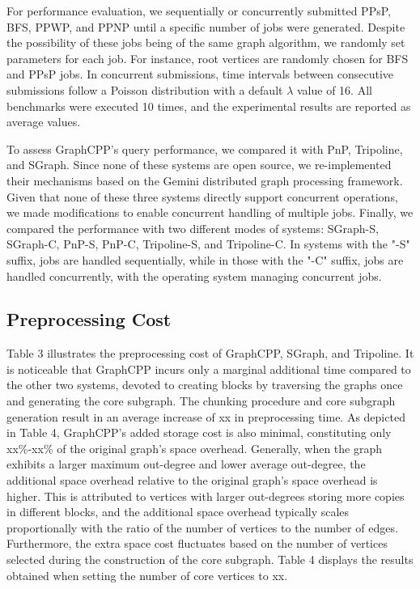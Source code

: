 \documentclass[lettersize,journal]{IEEEtran} %
\begin{document}
For performance evaluation, we sequentially or concurrently submitted PPsP, BFS, PPWP, and PPNP until a specific number of jobs were generated. Despite the possibility of these jobs being of the same graph algorithm, we randomly set parameters for each job. For instance, root vertices are randomly chosen for BFS and PPsP jobs. In concurrent submissions, time intervals between consecutive submissions follow a Poisson distribution with a default $\lambda$ value of 16. All benchmarks were executed 10 times, and the experimental results are reported as average values.

To assess GraphCPP's query performance, we compared it with PnP, Tripoline, and SGraph. Since none of these systems are open source, we re-implemented their mechanisms based on the Gemini distributed graph processing framework. Given that none of these three systems directly support concurrent operations, we made modifications to enable concurrent handling of multiple jobs. Finally, we compared the performance with two different modes of systems: SGraph-S, SGraph-C, PnP-S, PnP-C, Tripoline-S, and Tripoline-C. In systems with the "-S" suffix, jobs are handled sequentially, while in those with the "-C" suffix, jobs are handled concurrently, with the operating system managing concurrent jobs.
\subsection{Preprocessing Cost}
Table 3 illustrates the preprocessing cost of GraphCPP, SGraph, and Tripoline. It is noticeable that GraphCPP incurs only a marginal additional time compared to the other two systems, devoted to creating blocks by traversing the graphs once and generating the core subgraph. The chunking procedure and core subgraph generation result in an average increase of xx in preprocessing time. As depicted in Table 4, GraphCPP's added storage cost is also minimal, constituting only xx\%-xx\% of the original graph's space overhead. Generally, when the graph exhibits a larger maximum out-degree and lower average out-degree, the additional space overhead relative to the original graph's space overhead is higher. This is attributed to vertices with larger out-degrees storing more copies in different blocks, and the additional space overhead typically scales proportionally with the ratio of the number of vertices to the number of edges. Furthermore, the extra space cost fluctuates based on the number of vertices selected during the construction of the core subgraph. Table 4 displays the results obtained when setting the number of core vertices to xx.
\end{document}
